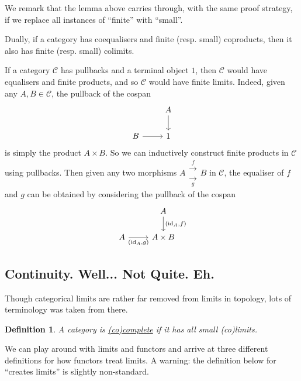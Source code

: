 \documentclass[a4paper,11pt]{article}
\theoremstyle{break_italics}
\newtheorem*{definition*}{Definition}
\theoremstyle{break_upright}
\theoremstyle{remark}
\newcommand{\id}{\mathrm{id}}
\newcommand{\C}{\mathcal{C}}
\begin{document}
We remark that the lemma above carries through, with the same proof strategy, if we replace all instances of ``finite'' with ``small''.

Dually, if a category has coequalisers and finite (resp. small) coproducts, then it also has finite (resp. small) colimits.

If a category $\C$ has pullbacks and a terminal object $1$, then $\C$ would have equalisers and finite products, and so $\C$ would have finite limits. Indeed, given any $A, B \in \C$, the pullback of the cospan
\[
\begin{tikzcd}
            & A \arrow[d] \\
B \arrow[r] & 1          
\end{tikzcd}
\]
is simply the product $A \times B$. So we can inductively construct finite products in $\C$ using pullbacks. Then given any two morphisms $A \substack{\xrightarrow{f} \\ \xrightarrow[g]{}} B$ in $\C$, the equaliser of $f$ and $g$ can be obtained by considering the pullback of the cospan
\[
\begin{tikzcd}
                             & A \arrow[d, "{(\id_A, f)}"] \\
A \arrow[r, "{(\id_A, g)}"'] & A \times B                 
\end{tikzcd}
\]










\subsection{Continuity. Well... Not Quite. Eh.}

Though categorical limits are rather far removed from limits in topology, lots of terminology was taken from there.

\begin{definition*}
A category is \uline{(co)complete} if it has all small (co)limits.
\end{definition*}

We can play around with limits and functors and arrive at three different definitions for how functors treat limits. A warning: the definition below for ``creates limits'' is slightly non-standard.
\end{document}
